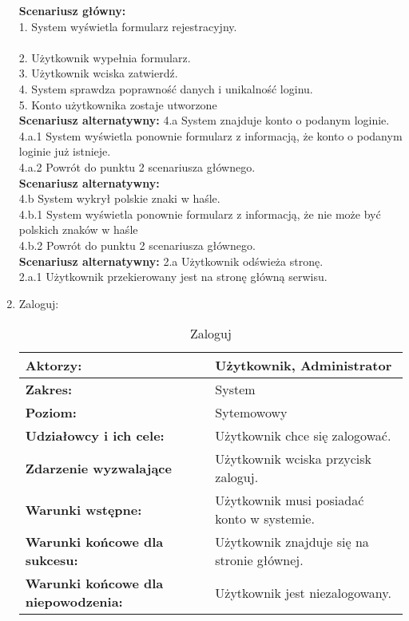 \begin{enumerate}[label=(\Roman*)]
\textbf{Scenariusz główny:}\\
1. System wyświetla formularz rejestracyjny.\\\\
2. Użytkownik wypełnia formularz.\\
3. Użytkownik wciska zatwierdź.\\
4. System sprawdza poprawność danych i unikalność loginu.\\
5. Konto użytkownika zostaje utworzone\\
\textbf{Scenariusz alternatywny:}
4.a System znajduje konto o podanym loginie.\\
4.a.1 System wyświetla ponownie formularz z informacją, że konto o podanym loginie już
istnieje.\\
4.a.2 Powrót do punktu 2 scenariusza głównego.\\
\textbf{Scenariusz alternatywny:}\\
4.b System wykrył polskie znaki w haśle.\\
4.b.1 System wyświetla ponownie formularz z informacją, że nie może być polskich znaków
w haśle\\
4.b.2 Powrót do punktu 2 scenariusza głównego.\\
\textbf{Scenariusz alternatywny:}
2.a Użytkownik odświeża stronę.\\
2.a.1 Użytkownik przekierowany jest na stronę główną serwisu.\\

\item Zaloguj:
	\begin{table}[H]
\centering
\caption{Zaloguj}
\label{Zaloguj}
\begin{tabular}{|p{7cm}|p{7cm}|}
  \hline 
  \textbf{Aktorzy:} & Użytkownik, Administrator\\
  \hline
  \textbf{Zakres:} & System \\
	\hline
  \textbf{Poziom:} & Sytemowowy \\
	\hline
  \textbf{Udziałowcy i ich cele: } & Użytkownik chce się zalogować.
 \\
	\hline
  \textbf{Zdarzenie wyzwalające } & Użytkownik wciska przycisk zaloguj.\\
	\hline
  \textbf{Warunki wstępne: } & Użytkownik musi posiadać konto w systemie. \\
	\hline
  \textbf{Warunki końcowe dla sukcesu:} & Użytkownik znajduje się na stronie głównej.\\
	\hline
  \textbf{Warunki końcowe dla niepowodzenia:} & Użytkownik jest niezalogowany. \\
  \hline
\end{tabular} 
\end{table}


\end{enumerate}
